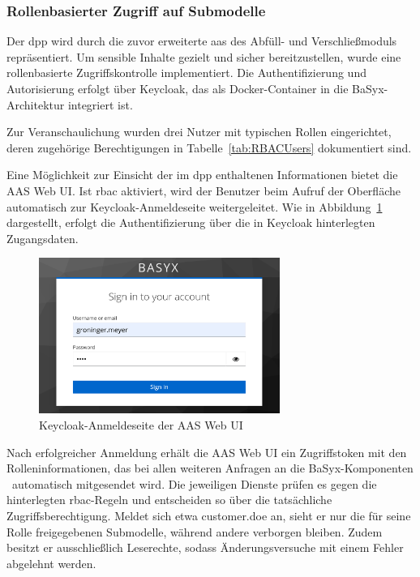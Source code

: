 \newpage
\subsubsection{Rollenbasierter Zugriff auf Submodelle}
Der \acs{dpp} wird durch die zuvor erweiterte \acs{aas} des Abfüll- und Verschließmoduls repräsentiert. 
Um sensible Inhalte gezielt und sicher bereitzustellen, wurde eine rollenbasierte Zugriffskontrolle implementiert. 
Die Authentifizierung und Autorisierung erfolgt über Keycloak, das als Docker-Container in die BaSyx-Architektur integriert ist.

Zur Veranschaulichung wurden drei Nutzer mit typischen Rollen eingerichtet, deren zugehörige Berechtigungen in Tabelle~\ref{tab:RBACUsers} dokumentiert sind.


    
\vspace{-0.25em}
Eine Möglichkeit zur Einsicht der im \acs{dpp} enthaltenen Informationen bietet die AAS Web UI.
Ist \acs{rbac} aktiviert, wird der Benutzer beim Aufruf der Oberfläche automatisch zur Keycloak-Anmeldeseite weitergeleitet.
Wie in Abbildung~\ref{fig:KeycloakAnmeldeSeite} dargestellt, erfolgt die Authentifizierung über die in Keycloak hinterlegten Zugangsdaten.

\vspace{0.4em}
\begin{figure}[htbp]
    \centering
        \includegraphics[width=0.7\textwidth]{Bilder/KeycloakAnmeldeSeite.png}
    \caption{Keycloak-Anmeldeseite der AAS Web UI}
    \label{fig:KeycloakAnmeldeSeite}
\end{figure}

\vspace{-0.35em}

Nach erfolgreicher Anmeldung erhält die AAS Web UI ein Zugriffstoken mit den Rolleninformationen, das bei allen weiteren Anfragen an die BaSyx-Komponenten%
\pagebreak
~automatisch mitgesendet wird.
Die jeweiligen Dienste prüfen es gegen die hinterlegten \acs{rbac}-Regeln und entscheiden so über die tatsächliche Zugriffsberechtigung.
Meldet sich etwa customer.doe an, sieht er nur die für seine Rolle freigegebenen Submodelle, während andere verborgen bleiben.
Zudem besitzt er ausschließlich Leserechte, sodass Änderungsversuche mit einem Fehler abgelehnt werden.

